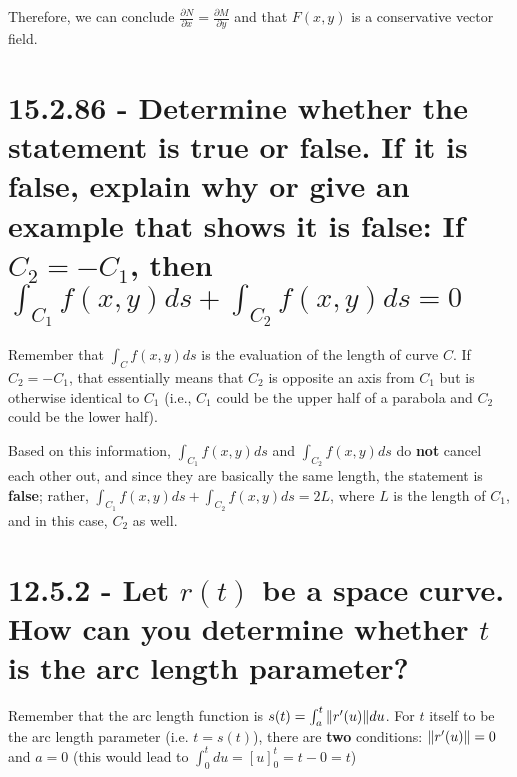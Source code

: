 \documentclass{article}
\begin{document}
\par\noindent\Large Therefore, we can conclude $\frac{\partial N}{\partial x} = \frac{\partial M}{\partial y}$ and that $F(x, y)$ is a conservative vector field.

\section{15.2.86 - Determine whether the statement is true or false.  If it is false, explain why or give an example that shows it is false: If $C_{2} = -C_{1}$, then $\int_{C_{1}}f(x, y)ds + \int_{C_{2}}f(x, y)ds = 0$}

\par\noindent\Large Remember that $\int_{C}f(x, y)ds$ is the evaluation of the length of curve $C$.  If $C_{2} = -C_{1}$, that essentially means that $C_{2}$ is opposite an axis from $C_{1}$ but is otherwise identical to $C_{1}$ (i.e., $C_{1}$ could be the upper half of a parabola and $C_{2}$ could be the lower half).\vspace{0.25cm}

\par\noindent\Large Based on this information, $\int_{C_{1}}f(x, y)ds$ and $\int_{C_{2}}f(x, y)ds$ do \textbf{not} cancel each other out, and since they are basically the same length, the statement is \textbf{false}; rather, $\int_{C_{1}}f(x, y)ds + \int_{C_{2}}f(x, y)ds = 2L$, where $L$ is the length of $C_{1}$, and in this case, $C_{2}$ as well.

\section{12.5.2 - Let $r(t)$ be a space curve.  How can you determine whether $t$ is the arc length parameter?}

\par\noindent\Large Remember that the arc length function is $s(t) = \int_{a}^{t}\norm{r'(u)}du$.  For $t$ itself to be the arc length parameter (i.e. $t = s(t)$), there are \textbf{two} conditions: $\norm{r'(u)} = 0$ and $a = 0$ (this would lead to $\int_{0}^{t}du = [u]_{0}^{t} = t - 0 = t$)
\end{document}
